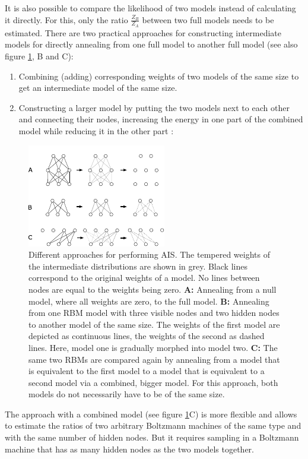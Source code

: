 \documentclass[12pt]{article}
\begin{document}
It is also possible to compare the likelihood of two models instead of calculating it directly.
For this, only the ratio $\frac{Z_B}{Z_A}$ between two full models needs to be estimated.
There are two practical approaches for constructing intermediate models  for directly annealing from one full model to another full model (see also figure \ref{figTwotypesais}, B and C):
\begin{enumerate}
\item Combining (adding) corresponding weights of two models of the same size to get an intermediate model of the same size.
\item Constructing a larger model by putting the two models next to each other and connecting their nodes, increasing the energy in one part of the combined model while reducing it in the other part \citep{theis2011deepbelief}:
\end{enumerate}
\begin{figure}[h!]
\centering
\includegraphics[scale=3.5]{images/twotypesais.pdf}
\caption{Different approaches for performing AIS. 
The tempered weights of the intermediate distributions are shown in grey. Black lines correspond to the original weights of a model. No lines between nodes are equal to the weights being zero.
{\bf A:} Annealing from a null model, where all weights are zero, to the full model.
{\bf B:} Annealing from one RBM model with three visible nodes and two hidden nodes to another model of the same size.
The weights of the first model are depicted as continuous lines, the weights of the second as dashed lines. Here, model one is gradually morphed into model two. {\bf C:} 
The same two RBMs are compared again by annealing from a model that is equivalent to the first model to a model that is equivalent to a second model via a combined, bigger model. For this approach, both models do not necessarily have to be of the same size.}
\label{figTwotypesais}
\end{figure}
The approach with a combined model (see figure \ref{figTwotypesais}C) is more flexible and allows to estimate the ratios of two arbitrary Boltzmann machines of the same type and with the same number of hidden nodes.
But it requires sampling in a Boltzmann machine that has as many hidden nodes as the two models together.
\end{document}
